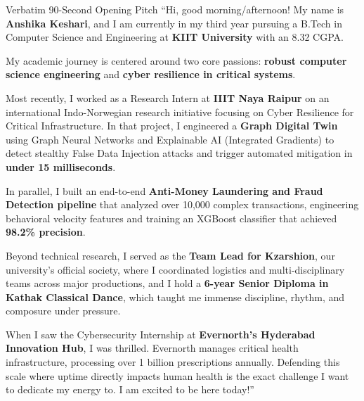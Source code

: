 \documentclass[10pt,a4paper]{article}
\begin{document}
\begin{scriptbox}{Verbatim 90-Second Opening Pitch}
``Hi, good morning/afternoon! My name is \textbf{Anshika Keshari}, and I am currently in my third year pursuing a B.Tech in Computer Science and Engineering at \textbf{KIIT University} with an 8.32 CGPA.

My academic journey is centered around two core passions: \textbf{robust computer science engineering} and \textbf{cyber resilience in critical systems}. 

Most recently, I worked as a Research Intern at \textbf{IIIT Naya Raipur} on an international Indo-Norwegian research initiative focusing on Cyber Resilience for Critical Infrastructure. In that project, I engineered a \textbf{Graph Digital Twin} using Graph Neural Networks and Explainable AI (Integrated Gradients) to detect stealthy False Data Injection attacks and trigger automated mitigation in \textbf{under 15 milliseconds}. 

In parallel, I built an end-to-end \textbf{Anti-Money Laundering and Fraud Detection pipeline} that analyzed over 10,000 complex transactions, engineering behavioral velocity features and training an XGBoost classifier that achieved \textbf{98.2\% precision}.

Beyond technical research, I served as the \textbf{Team Lead for Kzarshion}, our university's official society, where I coordinated logistics and multi-disciplinary teams across major productions, and I hold a \textbf{6-year Senior Diploma in Kathak Classical Dance}, which taught me immense discipline, rhythm, and composure under pressure.

When I saw the Cybersecurity Internship at \textbf{Evernorth's Hyderabad Innovation Hub}, I was thrilled. Evernorth manages critical health infrastructure, processing over 1 billion prescriptions annually. Defending this scale where uptime directly impacts human health is the exact challenge I want to dedicate my energy to. I am excited to be here today!''
\end{scriptbox}
\end{document}
